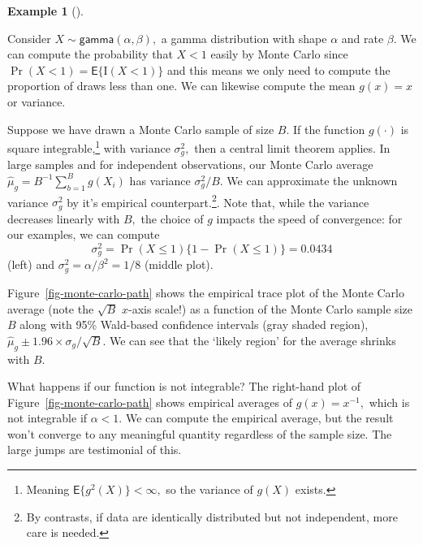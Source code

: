 \documentclass[
  11pt,
  letterpaper,
]{scrbook}
\theoremstyle{definition}
\theoremstyle{plain}
\theoremstyle{plain}
\theoremstyle{definition}
\theoremstyle{definition}
\newtheorem{example}{Example}[chapter]
\theoremstyle{remark}
\begin{document}
\begin{example}[]\protect\hypertarget{exm-expectation-demo}{}\label{exm-expectation-demo}

Consider \(X \sim \mathsf{gamma}(\alpha, \beta),\) a gamma distribution
with shape \(\alpha\) and rate \(\beta.\) We can compute the probability
that \(X < 1\) easily by Monte Carlo since
\(\Pr(X <1) = \mathsf{E}\{\mathrm{I}(X<1)\}\) and this means we only
need to compute the proportion of draws less than one. We can likewise
compute the mean \(g(x) = x\) or variance.

Suppose we have drawn a Monte Carlo sample of size \(B.\) If the
function \(g(\cdot)\) is square integrable,\footnote{Meaning
  \(\mathsf{E}\{g^2(X)\}<\infty,\) so the variance of \(g(X)\) exists.}
with variance \(\sigma^2_g,\) then a central limit theorem applies. In
large samples and for independent observations, our Monte Carlo average
\(\widehat{\mu}_g = B^{-1}\sum_{b=1}^B g(X_i)\) has variance
\(\sigma^2_g/B.\) We can approximate the unknown variance \(\sigma^2_g\)
by it's empirical counterpart.\footnote{By contrasts, if data are
  identically distributed but not independent, more care is needed.}.
Note that, while the variance decreases linearly with \(B,\) the choice
of \(g\) impacts the speed of convergence: for our examples, we can
compute \[\sigma^2_g =\Pr(X \leq 1)\{1-\Pr(X \leq 1)\}=0.0434\] (left)
and \(\sigma^2_g=\alpha/\beta^2=1/8\) (middle plot).

Figure~\ref{fig-monte-carlo-path} shows the empirical trace plot of the
Monte Carlo average (note the \(\sqrt{B}\) \(x\)-axis scale!) as a
function of the Monte Carlo sample size \(B\) along with 95\% Wald-based
confidence intervals (gray shaded region),
\(\widehat{\mu}_g \pm 1.96 \times \sigma_g/\sqrt{B}.\) We can see that
the `likely region' for the average shrinks with \(B.\)

What happens if our function is not integrable? The right-hand plot of
Figure~\ref{fig-monte-carlo-path} shows empirical averages of
\(g(x) = x^{-1},\) which is not integrable if \(\alpha < 1.\) We can
compute the empirical average, but the result won't converge to any
meaningful quantity regardless of the sample size. The large jumps are
testimonial of this.

\begin{figure}[ht!]

\centering{

}
\end{figure}
\end{example}
\end{document}
